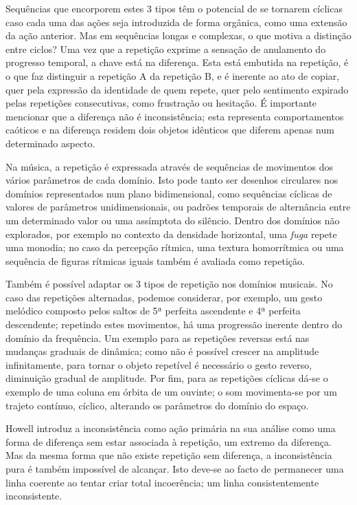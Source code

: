 \documentclass[../main.tex]{subfiles}
\begin{document}
Sequências que encorporem estes 3 tipos têm o potencial de se tornarem cíclicas caso cada uma das ações seja introduzida de forma orgânica, como uma extensão da ação anterior. Mas em sequências longas e complexas, o que motiva a distinção entre ciclos? Uma vez que a repetição exprime a sensação de anulamento do progresso temporal, a chave está na diferença. Esta está embutida na repetição, é o que faz distinguir a repetição A da repetição B, e é inerente ao ato de copiar, quer pela expressão da identidade de quem repete, quer pelo sentimento expirado pelas repetições consecutivas, como frustração ou hesitação. É importante mencionar que a diferença não é inconsistência; esta representa comportamentos caóticos e na diferença residem dois objetos idênticos que diferem apenas num determinado aspecto.

Na música, a repetição é expressada através de sequências de movimentos dos vários parâmetros de cada domínio. Isto pode tanto ser desenhos circulares nos domínios representados num plano bidimensional, como sequências cíclicas de valores de parâmetros unidimensionais, ou padrões temporais de alternância entre um determinado valor ou uma assímptota do silêncio. Dentro dos domínios não explorados, por exemplo no contexto da densidade horizontal, uma \textsl{fuga} repete uma monodia; no caso da percepção rítmica, uma textura homorrítmica ou uma sequência de figuras rítmicas iguais também é avaliada como repetição.

Também é possível adaptar os 3 tipos de repetição nos domínios musicais. No caso das repetições alternadas, podemos considerar, por exemplo, um gesto melódico composto pelos saltos de 5ª perfeita ascendente e 4ª perfeita descendente; repetindo estes movimentos, há uma progressão inerente dentro do domínio da frequência. Um exemplo para as repetições reversas está nas mudanças graduais de dinâmica; como não é possível crescer na amplitude infinitamente, para tornar o objeto repetível é necessário o gesto reverso, diminuição gradual de amplitude. Por fim, para as repetições cíclicas dá-se o exemplo de uma coluna em órbita de um ouvinte; o som movimenta-se por um trajeto contínuo, cíclico, alterando os parâmetros do domínio do espaço.


Howell introduz a inconsistência como ação primária na sua análise como uma forma de diferença sem estar associada à repetição, um extremo da diferença\cite{howell1999}. Mas da mesma forma que não existe repetição sem diferença, a inconsistência pura é também impossível de alcançar. Isto deve-se ao facto de permanecer uma linha coerente ao tentar criar total incoerência; um linha consistentemente inconsistente.
\end{document}
